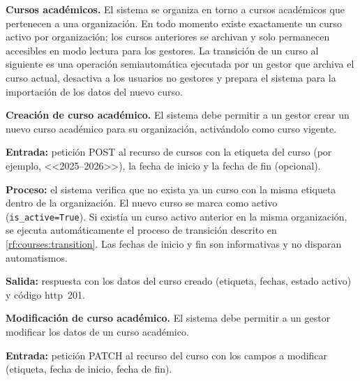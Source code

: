 
\item \textbf{Cursos académicos.} \label{rf:courses}
El sistema se organiza en torno a cursos académicos que pertenecen a una organización. En
todo momento existe exactamente un curso activo por organización; los cursos anteriores se
archivan y solo permanecen accesibles en modo lectura para los gestores. La transición de
un curso al siguiente es una operación semiautomática ejecutada por un gestor que archiva
el curso actual, desactiva a los usuarios no gestores y prepara el sistema para la
importación de los datos del nuevo curso.

\begin{functional}

    \item \textbf{Creación de curso académico.} \label{rf:courses:create}
    El sistema debe permitir a un gestor crear un nuevo curso académico para su
    organización, activándolo como curso vigente.

    \textbf{Entrada:} petición POST al recurso de cursos con la etiqueta del curso (por
    ejemplo, <<2025--2026>>), la fecha de inicio y la fecha de fin (opcional).

    \textbf{Proceso:} el sistema verifica que no exista ya un curso con la misma etiqueta
    dentro de la organización. El nuevo curso se marca como activo
    (\texttt{is\_active=True}). Si existía un curso activo anterior en la misma
    organización, se ejecuta automáticamente el proceso de transición descrito en
    \cref{rf:courses:transition}. Las fechas de inicio y fin son informativas y no disparan
    automatismos.

    \textbf{Salida:} respuesta con los datos del curso creado (etiqueta, fechas, estado
    activo) y código \acs{http}~201.

    \item \textbf{Modificación de curso académico.} \label{rf:courses:update}
    El sistema debe permitir a un gestor modificar los datos de un curso académico.

    \textbf{Entrada:} petición PATCH al recurso del curso con los campos a modificar
    (etiqueta, fecha de inicio, fecha de fin).


\end{functional}
